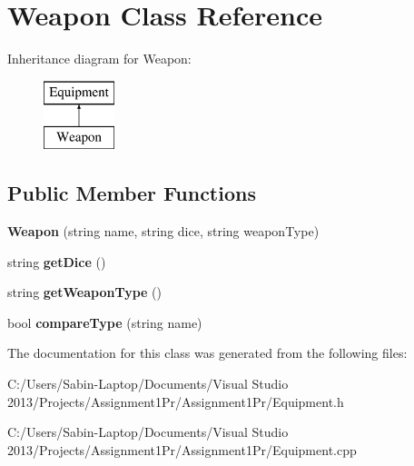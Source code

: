 \hypertarget{class_weapon}{}\section{Weapon Class Reference}
\label{class_weapon}
Inheritance diagram for Weapon\+:\begin{figure}[H]
\begin{center}
\leavevmode
\includegraphics[height=2.000000cm]{class_weapon}
\end{center}
\end{figure}
\subsection*{Public Member Functions}
\begin{DoxyCompactItemize}
\item 
\hypertarget{class_weapon_a0d5813feaa1ae526d617299c7ab8fa91}{}\label{class_weapon_a0d5813feaa1ae526d617299c7ab8fa91} 
{\bfseries Weapon} (string name, string dice, string weapon\+Type)
\item 
\hypertarget{class_weapon_a2da3cca591bea042f39f3a29cccf0355}{}\label{class_weapon_a2da3cca591bea042f39f3a29cccf0355} 
string {\bfseries get\+Dice} ()
\item 
\hypertarget{class_weapon_a3b2f7a59da307c3af74da979cbc4e312}{}\label{class_weapon_a3b2f7a59da307c3af74da979cbc4e312} 
string {\bfseries get\+Weapon\+Type} ()
\item 
\hypertarget{class_weapon_a174d32f2e043fd4d1cb1b2e0f3edd75d}{}\label{class_weapon_a174d32f2e043fd4d1cb1b2e0f3edd75d} 
bool {\bfseries compare\+Type} (string name)
\end{DoxyCompactItemize}


The documentation for this class was generated from the following files\+:\begin{DoxyCompactItemize}
\item 
C\+:/\+Users/\+Sabin-\/\+Laptop/\+Documents/\+Visual Studio 2013/\+Projects/\+Assignment1\+Pr/\+Assignment1\+Pr/Equipment.\+h\item 
C\+:/\+Users/\+Sabin-\/\+Laptop/\+Documents/\+Visual Studio 2013/\+Projects/\+Assignment1\+Pr/\+Assignment1\+Pr/Equipment.\+cpp\end{DoxyCompactItemize}
